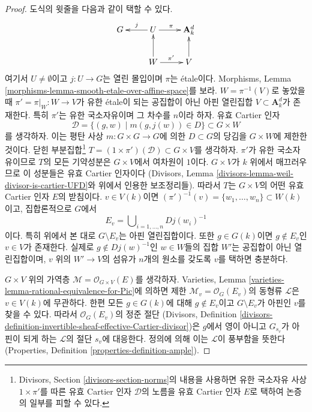 \begin{proof}
\medskip\noindent
도식의 윗줄을 다음과 같이 택할 수 있다.
$$
\xymatrix{
G & U \ar[l]_j \ar[r]^\pi & \mathbf{A}^d_k \\
& W \ar[r]^{\pi'} \ar[u] & V \ar[u]
}
$$
여기서 $U \not = \emptyset$이고 $j : U \to G$는 열린 몰입이며 $\pi$는 \'etale이다. Morphisms, Lemma
\ref{morphisms-lemma-smooth-etale-over-affine-space}를 보라. $W = \pi^{-1}(V)$로 놓았을 때
$\pi' = \pi|_W : W \to V$가 유한 \'etale이 되는 공집합이 아닌 아핀 열린집합
$V \subset \mathbf{A}^d_k$가 존재한다. 특히 $\pi'$는 유한 국소자유이며 그 차수를 $n$이라 하자.
유효 Cartier 인자
$$
\mathcal{D} = \{(g, w) \mid m(g, j(w)) \in D\} \subset G \times W
$$
를 생각하자. 이는 평탄 사상 $m : G \times G \to G$에 의한 $D \subset G$의 당김을 $G \times W$에 제한한 것이다.
닫힌 부분집합\footnote{Divisors, Section \ref{divisors-section-norms}의 내용을 사용하면
유한 국소자유 사상 $1 \times \pi'$를 따른 유효 Cartier 인자 $\mathcal{D}$의 노름을 유효 Cartier 인자
$E$로 택하여 논증의 일부를 피할 수 있다.}
$T = (1 \times \pi')(\mathcal{D}) \subset G \times V$를 생각하자. $\pi'$가 유한 국소자유이므로 $T$의 모든 기약성분은
$G \times V$에서 여차원이 $1$이다. $G \times V$가 $k$ 위에서 매끄러우므로 이 성분들은 유효 Cartier 인자이다
(Divisors, Lemma \ref{divisors-lemma-weil-divisor-is-cartier-UFD}와 위에서 인용한 보조정리들).
따라서 $T$는 $G \times V$의 어떤 유효 Cartier 인자 $E$의 받침이다. $v \in V(k)$이면
$(\pi')^{-1}(v) = \{w_1, \ldots, w_n\} \subset W(k)$이고, 집합론적으로 $G$에서
$$
E_v = \bigcup\nolimits_{i = 1, \ldots, n} D j(w_i)^{-1}
$$
이다. 특히 위에서 본 대로 $G \setminus E_v$는 아핀 열린집합이다. 또한 $g \in G(k)$이면
$g \not \in E_v$인 $v \in V$가 존재한다. 실제로 $g \not \in Dj(w)^{-1}$인 $w \in W$들의 집합 $W'$는
공집합이 아닌 열린집합이며, $v$ 위의 $W' \to V$의 섬유가 $n$개의 원소를 갖도록 $v$를 택하면 충분하다.

\medskip\noindent
$G \times V$ 위의 가역층 $\mathcal{M} = \mathcal{O}_{G \times V}(E)$를 생각하자. Varieties, Lemma
\ref{varieties-lemma-rational-equivalence-for-Pic}에 의하면 제한 $\mathcal{M}_v = \mathcal{O}_G(E_v)$의 동형류
$\mathcal{L}$은 $v \in V(k)$에 무관하다. 한편 모든 $g \in G(k)$에 대해 $g \not \in E_v$이고
$G \setminus E_v$가 아핀인 $v$를 찾을 수 있다. 따라서 $\mathcal{O}_G(E_v)$의 정준 절단
(Divisors, Definition \ref{divisors-definition-invertible-sheaf-effective-Cartier-divisor})은 $g$에서 영이 아니고
$G_{s_v}$가 아핀이 되게 하는 $\mathcal{L}$의 절단 $s_v$에 대응한다. 정의에 의해 이는 $\mathcal{L}$이
풍부함을 뜻한다(Properties, Definition \ref{properties-definition-ample}).
\end{proof}

